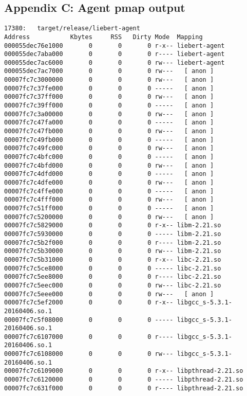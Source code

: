     \subsection{Appendix C: Agent pmap output}\label{apd:pmap-agent}
        \begin{verbatim}
17380:   target/release/liebert-agent
Address           Kbytes     RSS   Dirty Mode  Mapping
000055dec76e1000       0       0       0 r-x-- liebert-agent
000055dec7aba000       0       0       0 r---- liebert-agent
000055dec7ac6000       0       0       0 rw--- liebert-agent
000055dec7ac7000       0       0       0 rw---   [ anon ]
00007fc7c3000000       0       0       0 rw---   [ anon ]
00007fc7c37fe000       0       0       0 -----   [ anon ]
00007fc7c37ff000       0       0       0 rw---   [ anon ]
00007fc7c39ff000       0       0       0 -----   [ anon ]
00007fc7c3a00000       0       0       0 rw---   [ anon ]
00007fc7c47fa000       0       0       0 -----   [ anon ]
00007fc7c47fb000       0       0       0 rw---   [ anon ]
00007fc7c49fb000       0       0       0 -----   [ anon ]
00007fc7c49fc000       0       0       0 rw---   [ anon ]
00007fc7c4bfc000       0       0       0 -----   [ anon ]
00007fc7c4bfd000       0       0       0 rw---   [ anon ]
00007fc7c4dfd000       0       0       0 -----   [ anon ]
00007fc7c4dfe000       0       0       0 rw---   [ anon ]
00007fc7c4ffe000       0       0       0 -----   [ anon ]
00007fc7c4fff000       0       0       0 rw---   [ anon ]
00007fc7c51ff000       0       0       0 -----   [ anon ]
00007fc7c5200000       0       0       0 rw---   [ anon ]
00007fc7c5829000       0       0       0 r-x-- libm-2.21.so
00007fc7c5930000       0       0       0 ----- libm-2.21.so
00007fc7c5b2f000       0       0       0 r---- libm-2.21.so
00007fc7c5b30000       0       0       0 rw--- libm-2.21.so
00007fc7c5b31000       0       0       0 r-x-- libc-2.21.so
00007fc7c5ce8000       0       0       0 ----- libc-2.21.so
00007fc7c5ee8000       0       0       0 r---- libc-2.21.so
00007fc7c5eec000       0       0       0 rw--- libc-2.21.so
00007fc7c5eee000       0       0       0 rw---   [ anon ]
00007fc7c5ef2000       0       0       0 r-x-- libgcc_s-5.3.1-20160406.so.1
00007fc7c5f08000       0       0       0 ----- libgcc_s-5.3.1-20160406.so.1
00007fc7c6107000       0       0       0 r---- libgcc_s-5.3.1-20160406.so.1
00007fc7c6108000       0       0       0 rw--- libgcc_s-5.3.1-20160406.so.1
00007fc7c6109000       0       0       0 r-x-- libpthread-2.21.so
00007fc7c6120000       0       0       0 ----- libpthread-2.21.so
00007fc7c631f000       0       0       0 r---- libpthread-2.21.so

\end{verbatim}
